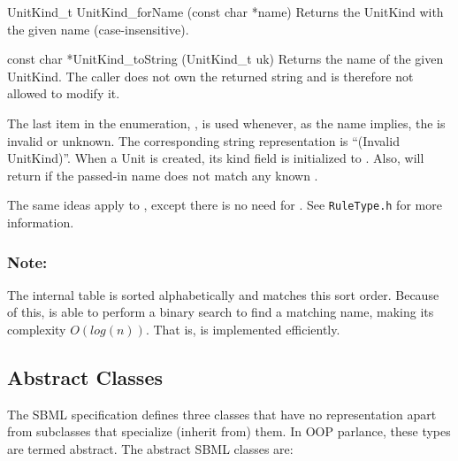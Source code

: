 \documentclass{cekmanual}
\begin{document}
\begin{methoddef}{UnitKind\_t UnitKind\_forName (const char *name)}
  Returns the UnitKind with the given name (case-insensitive).
\end{methoddef}

\begin{methoddef}{const char *UnitKind\_toString (UnitKind\_t uk)}
  Returns the name of the given UnitKind.  The caller does not own the
  returned string and is therefore not allowed to modify it.
\end{methoddef}

The last item in the enumeration, , is used
whenever, as the name implies, the  is invalid or
unknown.  The corresponding string representation is ``(Invalid
UnitKind)''.  When a Unit is created, its kind field is initialized to
.  Also,  will
return  if the passed-in name does not
match any known .

The same ideas apply to , except there is no need for
.  See \texttt{RuleType.h} for more
information.

\subsubsection{Note:}

The internal  table is sorted
alphabetically and  matches this sort order.
Because of this,  is able to perform a
binary search to find a matching name, making its complexity
$O(log(n))$.  That is,  is implemented
efficiently.


\subsection{Abstract Classes}
\label{sec:abstract-classes}

The SBML specification defines three classes that have no
representation apart from subclasses that specialize (inherit from)
them.  In OOP parlance, these types are termed abstract.  The abstract
SBML classes are:
\end{document}
